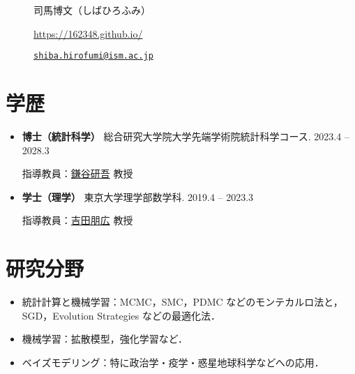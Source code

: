 \documentclass[
  11pt,
]{article}
\date{}
\renewcommand{\labelitemi}{\textcolor{minty}{\faCheckCircle}} %
\begin{document}
\begin{figure}

\begin{minipage}{0.50\linewidth}
\Huge 司馬博文（しばひろふみ）\end{minipage}%
%
\begin{minipage}{0.50\linewidth}

\color{minty}

\hfill {} \url{https://162348.github.io/}

\par

\hfill {}
\href{mailto:shiba.hirofumi@ism.ac.jp}{\nolinkurl{shiba.hirofumi@ism.ac.jp}}

\par

\end{minipage}%

\end{figure}%

\vspace{-1em}

\section{学歴}\label{ux5b66ux6b74}

\renewcommand{\labelitemi}{\textcolor{minty}{\faGraduationCap}}

\begin{itemize}
\item
  \textbf{博士（統計科学）} 総合研究大学院大学先端学術院統計科学コース.
  \hfill {2023.4 -- 2028.3}

  指導教員：\href{https://sites.google.com/view/kengokamatani/home}{鎌谷研吾}
  教授
\item
  \textbf{学士（理学）} 東京大学理学部数学科. \hfill {2019.4 -- 2023.3}

  指導教員：\href{https://www.ms.u-tokyo.ac.jp/~nakahiro/hp-naka-e}{吉田朋広}
  教授
\end{itemize}

\section{研究分野}\label{ux7814ux7a76ux5206ux91ce}

\renewcommand{\labelitemi}{\textcolor{minty}{\faCheck}}

\begin{itemize}
\item
  統計計算と機械学習：MCMC，SMC，PDMC
  などのモンテカルロ法と，SGD，Evolution Strategies などの最適化法．
\item
  機械学習：拡散模型，強化学習など．
\item
  ベイズモデリング：特に政治学・疫学・惑星地球科学などへの応用．
\end{itemize}
\end{document}
